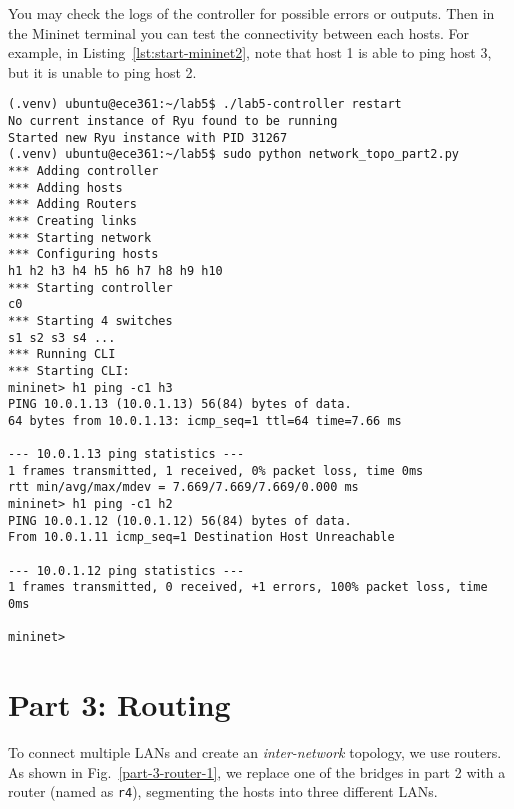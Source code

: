 \documentclass[11pt]{article}
\begin{document}
You may check the logs of the controller for possible errors or outputs.
Then in the Mininet terminal you can test the connectivity between each hosts.
For example, in Listing~\ref{lst:start-mininet2}, note that host 1 is able to ping host 3, but it is unable to ping host 2.
\begin{lstlisting}[style=ece361shell, caption={Sample workflow for creating the topology in part 2 and testing the code.}, label={lst:start-mininet2}]
(.venv) ubuntu@ece361:~/lab5$ ./lab5-controller restart
No current instance of Ryu found to be running
Started new Ryu instance with PID 31267
(.venv) ubuntu@ece361:~/lab5$ sudo python network_topo_part2.py
*** Adding controller
*** Adding hosts
*** Adding Routers
*** Creating links
*** Starting network
*** Configuring hosts
h1 h2 h3 h4 h5 h6 h7 h8 h9 h10
*** Starting controller
c0
*** Starting 4 switches
s1 s2 s3 s4 ...
*** Running CLI
*** Starting CLI:
mininet> h1 ping -c1 h3
PING 10.0.1.13 (10.0.1.13) 56(84) bytes of data.
64 bytes from 10.0.1.13: icmp_seq=1 ttl=64 time=7.66 ms

--- 10.0.1.13 ping statistics ---
1 frames transmitted, 1 received, 0% packet loss, time 0ms
rtt min/avg/max/mdev = 7.669/7.669/7.669/0.000 ms
mininet> h1 ping -c1 h2
PING 10.0.1.12 (10.0.1.12) 56(84) bytes of data.
From 10.0.1.11 icmp_seq=1 Destination Host Unreachable

--- 10.0.1.12 ping statistics ---
1 frames transmitted, 0 received, +1 errors, 100% packet loss, time 0ms

mininet>
\end{lstlisting}


\section{Part 3: Routing}
\label{sec:exercise3}
To connect multiple LANs and create an \textit{inter-network} topology, we use routers.
As shown in Fig.~\ref{part-3-router-1}, we replace one of the bridges in part 2 with a router (named as \texttt{r4}), segmenting the hosts into three different LANs.


\end{document}
